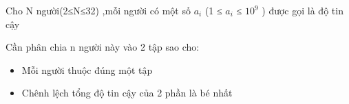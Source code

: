 Cho N người(2≤N≤32) ,mỗi người có một số $a_{i}$ (1 ≤ $a_{i}$ ≤ $10^{9}$ ) được gọi là độ tin cậy

Cần phân chia n người này vào 2 tập sao cho:
\begin{itemize}
	\item Mỗi người thuộc đúng một tập
	\item Chênh lệch tổng độ tin cậy của 2 phần là bé nhất
\end{itemize}